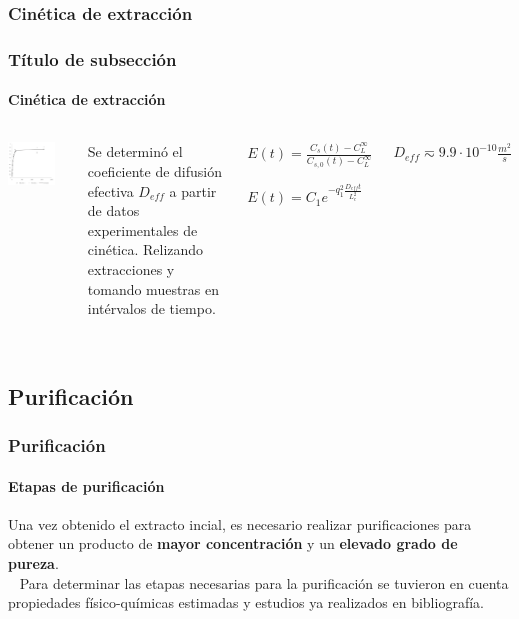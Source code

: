\documentclass[aspectratio=1610]{beamer}
\newcommand{\ssec}{Título de subsección}
\begin{document}
\subsubsection{Cinética de extracción}
\begin{frame}[c]
	\frametitle{\ssec}
	\framesubtitle{Cinética de extracción}
	\begin{columns}
	\begin{center}
		\includegraphics[width=0.8\textwidth]{figs/experimental-kinetics.png}
	\end{center}

	Se determinó el coeficiente de difusión efectiva $D_{eff}$ a partir de datos experimentales de cinética. Relizando extracciones y tomando muestras en intérvalos de tiempo. \\ ~ \\
	
	\begin{center}
	$E(t) = \frac{C_s(t) - C_L^\infty}{C_{s,0}(t) - C_L^\infty}$
	\vspace{0.5cm}

	$E(t) = C_1e^{-q_1^2\frac{D_{eff}t}{L_c^2}}$

	\end{center}

	\hfill $D_{eff} \eqsim 9.9 \cdot 10^{-10} \frac{m^2}{s}$
	\end{columns}
\end{frame}

\renewcommand{\ssec}{Purificación}
\subsection{\ssec}
\begin{frame}[c]
	\frametitle{\ssec}
	\framesubtitle{Etapas de purificación}
	Una vez obtenido el extracto incial, es necesario realizar purificaciones para
	obtener un producto de \textbf{mayor concentración} y un \textbf{elevado grado de pureza}.\\
	~
	Para determinar las etapas necesarias para la purificación se tuvieron en cuenta propiedades
	físico-químicas estimadas y estudios ya realizados en bibliografía.\\
\end{frame}
\end{document}
